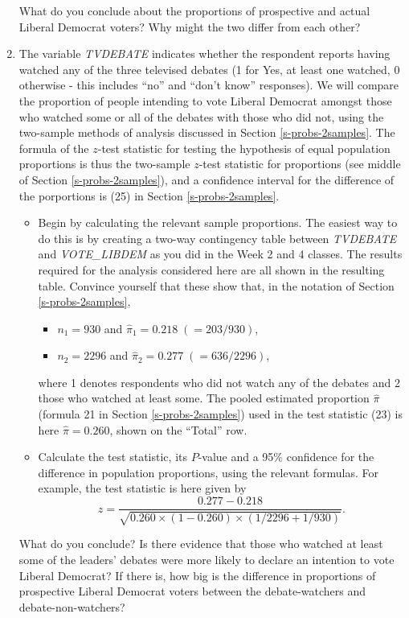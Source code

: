 \documentclass[11pt,a4paper,openany]{book}
\begin{document}
\begin{enumerate}
  What do you conclude about the proportions of prospective and actual
  Liberal Democrat voters? Why might the two differ from each other?
\item
  The variable \emph{TVDEBATE} indicates whether the respondent reports
  having watched any of the three televised debates (1 for Yes, at least
  one watched, 0 otherwise - this includes ``no'' and ``don't know''
  responses). We will compare the proportion of people intending to vote
  Liberal Democrat amongst those who watched some or all of the debates
  with those who did not, using the two-sample methods of analysis
  discussed in Section \ref{s-probs-2samples}. The formula of the
  \(z\)-test statistic for testing the hypothesis of equal population
  proportions is thus the two-sample \(z\)-test statistic for
  proportions (see middle of Section \ref{s-probs-2samples}), and a
  confidence interval for the difference of the porportions is (25) in
  Section \ref{s-probs-2samples}.

  \begin{itemize}
  \item
    Begin by calculating the relevant sample proportions. The easiest
    way to do this is by creating a two-way contingency table between
    \emph{TVDEBATE} and \emph{VOTE\_LIBDEM} as you did in the Week 2 and
    4 classes. The results required for the analysis considered here are
    all shown in the resulting table. Convince yourself that these show
    that, in the notation of Section \ref{s-probs-2samples},

    \begin{itemize}
    \item
      \(n_{1}=930\) and \(\hat{\pi}_{1}=0.218\; (=203/930)\),
    \item
      \(n_{2}=2296\) and \(\hat{\pi}_{2}=0.277\; (=636/2296)\),
    \end{itemize}

    where 1 denotes respondents who did not watch any of the debates and
    2 those who watched at least some. The pooled estimated proportion
    \(\hat{\pi}\) (formula 21 in Section \ref{s-probs-2samples}) used in
    the test statistic (23) is here \(\hat{\pi}=0.260\), shown on the
    ``Total'' row.
  \item
    Calculate the test statistic, its \(P\)-value and a 95\% confidence
    for the difference in population proportions, using the relevant
    formulas. For example, the test statistic is here given by
    \[z= \frac{0.277-0.218}{\sqrt{0.260\times (1-0.260)\times
    (1/2296+1/930)}}.\]
  \end{itemize}

  What do you conclude? Is there evidence that those who watched at
  least some of the leaders' debates were more likely to declare an
  intention to vote Liberal Democrat? If there is, how big is the
  difference in proportions of prospective Liberal Democrat voters
  between the debate-watchers and debate-non-watchers?
\end{enumerate}
\end{document}
